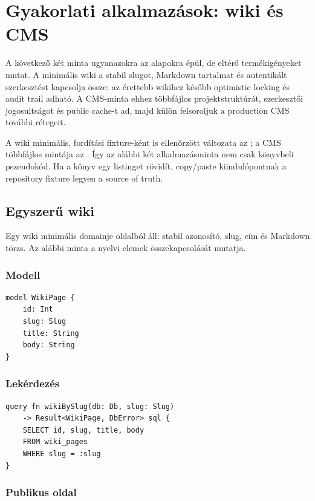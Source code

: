 \chapter{Gyakorlati alkalmazások: wiki és CMS}

A következő két minta ugyanazokra az alapokra épül, de eltérő termékigényeket mutat. A minimális wiki a stabil slugot, Markdown tartalmat és autentikált szerkesztést kapcsolja össze; az érettebb wikihez később optimistic locking és audit trail adható. A CMS-minta ehhez többfájlos projektstruktúrát, szerkesztői jogosultságot és public cache-t ad, majd külön felsoroljuk a production CMS további rétegeit.

A wiki minimális, fordítási fixture-ként is ellenőrzött változata az ; a CMS többfájlos mintája az . Így az alábbi két alkalmazásminta nem csak könyvbeli pszeudokód. Ha a könyv egy listinget rövidít, copy/paste kiindulópontnak a repository fixture legyen a source of truth.

\section{Egyszerű wiki}

Egy wiki minimális domainje oldalból áll: stabil azonosító, slug, cím és Markdown törzs. Az alábbi minta a nyelvi elemek összekapcsolását mutatja.

\subsection*{Modell}

\begin{lstlisting}[language=RWLang]
model WikiPage {
    id: Int
    slug: Slug
    title: String
    body: String
}
\end{lstlisting}

\subsection*{Lekérdezés}

\begin{lstlisting}[language=RWLang]
query fn wikiBySlug(db: Db, slug: Slug)
    -> Result<WikiPage, DbError> sql {
    SELECT id, slug, title, body
    FROM wiki_pages
    WHERE slug = :slug
}
\end{lstlisting}

\subsection*{Publikus oldal}


